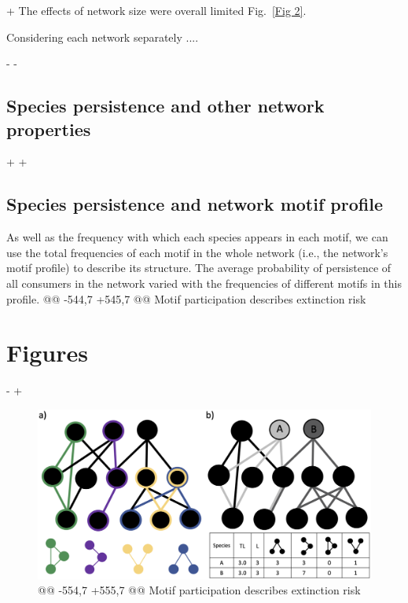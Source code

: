 +         The effects of network size were overall limited Fig.~\ref{Fig 2}.
         
         Considering each network separately ....
         
 
-
-    \subsection*{Species persistence and other network properties}
+%
+    \subsection*{Species persistence and network motif profile}
 
         As well as the frequency with which each species appears in each motif, we can use the total frequencies of each motif in the whole network (i.e., the network's motif profile) to describe its structure.
         The average probability of persistence of all consumers in the network varied with the frequencies of different motifs in this profile.
@@ -544,7 +545,7 @@ Motif participation describes extinction risk
 
 \section*{Figures}
     
-
+        %
         \begin{figure}[hb!]
         \centering
         \includegraphics[width=1.0\textwidth]{figures/concept_fig_ver2.eps}
@@ -554,7 +555,7 @@ Motif participation describes extinction risk
     \label{fig:concept}
     \end{figure}
 
